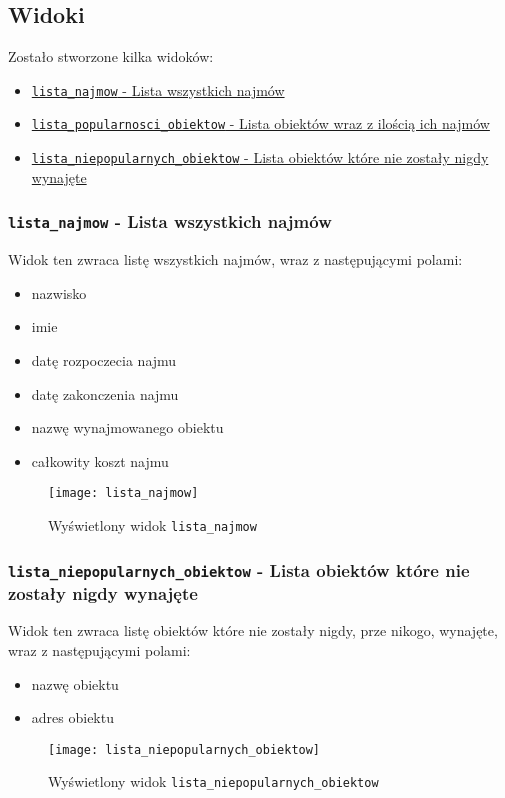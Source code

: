 \subsection{Widoki}

Zostało stworzone kilka widoków:
\begin{itemize}
	\item \href{run:Sources/SQL/2. Widoki/014_Utworzenie_widoku_z_lista_wszystkich_najmow.sql}{\texttt{lista\_najmow} - Lista wszystkich najmów}
	\item \href{run:Sources/SQL/2. Widoki/015_Utworzenie_widoku_z_lista_popularnosci_obiektow.sql}{\texttt{lista\_popularnosci\_obiektow} - Lista obiektów wraz z ilością ich najmów}
	\item \href{run:Sources/SQL/2. Widoki/016_Utworzenie_widoku_z_lista_niewynajmowanych_obiektow.sql}{\texttt{lista\_niepopularnych\_obiektow} - Lista obiektów które nie zostały nigdy wynajęte}
\end{itemize}

\subsubsection{\texttt{lista\_najmow} - Lista wszystkich najmów}

Widok ten zwraca listę wszystkich najmów, wraz z następującymi polami:
\begin{itemize}
	\item nazwisko
	\item imie
	\item datę rozpoczecia najmu
	\item datę zakonczenia najmu
	\item nazwę wynajmowanego obiektu
	\item całkowity koszt najmu
\end{itemize}

\begin{figure}[h]
	\centering
    \texttt{[image: lista\_najmow]}
	\caption{Wyświetlony widok \texttt{lista\_najmow}}
	\label{fig:lista_najmow}
\end{figure}



\subsubsection{\texttt{lista\_niepopularnych\_obiektow} - Lista obiektów które nie zostały nigdy wynajęte}

Widok ten zwraca listę obiektów które nie zostały nigdy, prze nikogo, wynajęte, wraz z następującymi polami:
\begin{itemize}
	\item nazwę obiektu
	\item adres obiektu
\end{itemize}

\begin{figure}[h]
	\centering
    \texttt{[image: lista\_niepopularnych\_obiektow]}
	\caption{Wyświetlony widok \texttt{lista\_niepopularnych\_obiektow}}
	\label{fig:lista_niepopularnych_obiektow}
\end{figure}
